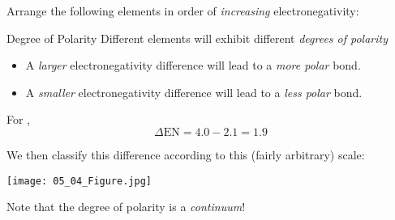 \documentclass[notes=hide]{beamer}
\begin{document}
\begin{onyourown}{5em}
	Arrange the following elements in order of \emph{increasing}
	electronegativity:
	
	\begin{center}
		 \qquad {} \qquad {}
	\end{center}
\end{onyourown}

\clearpage

\begin{frame}{Degree of Polarity}
	Different elements will exhibit different \emph{degrees of
	polarity}
	\begin{itemize}
		\item A \emph{larger} electronegativity
			difference will lead to a \emph{more
			polar} bond.
		\item A \emph{smaller} electronegativity
			difference will lead to a \emph{less
			polar} bond.
	\end{itemize}

	\bigskip

	\pause

	For ,
	\begin{equation*}
		\Delta \text{EN} = 4.0 - 2.1 = 1.9
	\end{equation*}

	\pause

	We then classify this difference according to this (fairly arbitrary)
	scale:
	\begin{center}
		\texttt{[image: 05\_04\_Figure.jpg]}

		\pause

		Note that the degree of polarity is a \emph{continuum}!
	\end{center}
\end{frame}
\end{document}
